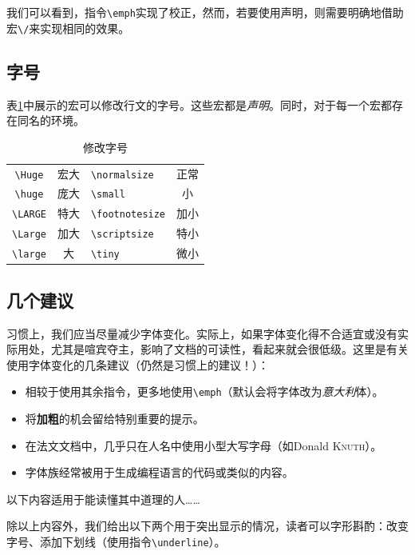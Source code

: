 我们可以看到，指令\verb|\emph|实现了校正，然而，若要使用声明，则需要明确地借助宏\verb|\/|来实现相同的效果。

\subsection{字号}

表\ref{tab:2.2}中展示的宏可以修改行文的字号。这些宏都是\emph{声明}。同时，对于每一个宏都存在同名的环境。

\begin{table}[ht]
    \centering
    \begin{tabular}{|c|c||l|c|}
\hline
\verb|\Huge| & {\Huge 宏大} & \verb|\normalsize| & {正常} \\
\verb|\huge| & {\huge 庞大} & \verb|\small| & {\small 小} \\
\verb|\LARGE| & {\LARGE 特大} & \verb|\footnotesize| & {\footnotesize 加小} \\
\verb|\Large| & {\Large 加大} & \verb|\scriptsize| & {\scriptsize 特小} \\
\verb|\large| & {\large 大} & \verb|\tiny| & {\tiny 微小} \\
\hline
    \end{tabular}
    \caption{修改字号}
    \label{tab:2.2}
\end{table}

\subsection{几个建议}

习惯上，我们应当尽量减少字体变化。实际上，如果字体变化得不合适宜或没有实际用处，尤其是喧宾夺主，影响了文档的可读性，看起来就会很低级。这里是有关使用字体变化的几条建议（仍然是习惯上的建议！）：
\begin{itemize}
    \item 相较于使用其余指令，更多地使用\verb+\emph+（默认会将字体改为\emph{意大利}体）。
    \item 将\textbf{加粗}的机会留给特别重要的提示。
    \item 在法文文档中，几乎只在人名中使用小型大写字母（如Donald \textsc{Knuth}）。
    \item {}字体族经常被用于生成编程语言的代码或类似的内容。
\end{itemize}

以下内容适用于能读懂其中道理的人……

除以上内容外，我们给出以下两个用于突出显示的情况，读者可以字形斟酌：改变字号、添加下划线（使用指令\verb|\underline|）。


